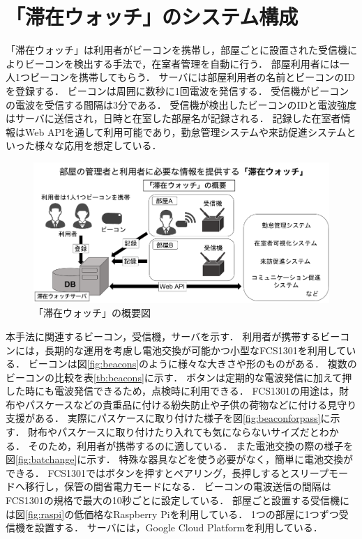 

\section{「滞在ウォッチ」のシステム構成}\label{3.1}



「滞在ウォッチ」は利用者がビーコンを携帯し，部屋ごとに設置された受信機によりビーコンを検出する手法で，在室者管理を自動に行う．
部屋利用者には一人1つビーコンを携帯してもらう．
サーバには部屋利用者の名前とビーコンのIDを登録する．
ビーコンは周囲に数秒に1回電波を発信する．
受信機がビーコンの電波を受信する間隔は3分である．
受信機が検出したビーコンのIDと電波強度はサーバに送信され，日時と在室した部屋名が記録される．
記録した在室者情報はWeb APIを通して利用可能であり，勤怠管理システムや来訪促進システムといった様々な応用を想定している．

\begin{figure}[h]
  \centering  %
  \includegraphics[clip,scale = 0.45]{image/platform-idea.pdf}
  \caption{「滞在ウォッチ」の概要図}    \label{StayWatchOverview}
\end{figure}

本手法に関連するビーコン，受信機，サーバを示す．
利用者が携帯するビーコンには，長期的な運用を考慮し電池交換が可能かつ小型なFCS1301\cite{fcs1301}を利用している．
ビーコンは図\ref{fig:beacons}のように様々な大きさや形のものがある．
複数のビーコンの比較を表\ref{tb:beacons}に示す．
ボタンは定期的な電波発信に加えて押した時にも電波発信できるため，点検時に利用できる．
FCS1301の用途は，財布やパスケースなどの貴重品に付ける紛失防止や子供の荷物などに付ける見守り支援がある．
実際にパスケースに取り付けた様子を図\ref{fig:beaconforpass}に示す．
財布やパスケースに取り付けたり入れても気にならないサイズだとわかる．
そのため，利用者が携帯するのに適している．
また電池交換の際の様子を図\ref{fig:batchange}に示す．
特殊な器具などを使う必要がなく，簡単に電池交換ができる．
FCS1301ではボタンを押すとペアリング，長押しするとスリープモードへ移行し，保管の間省電力モードになる．
ビーコンの電波送信の間隔はFCS1301の規格で最大の10秒ごとに設定している．
部屋ごと設置する受信機には図\ref{fig:raspi}の低価格なRaspberry Pi\cite{raspi}を利用している．
1つの部屋に1つずつ受信機を設置する．
サーバには，Google Cloud Platform\cite{platform}を利用している．

